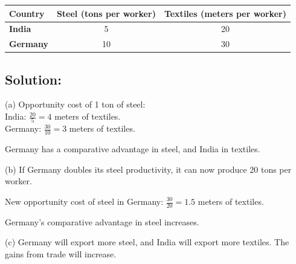 \documentclass{article}
\begin{document}
\begin{table}[h]
    \centering
    \begin{tabular}{lcc}
        \toprule
        Country & Steel (tons per worker) & Textiles (meters per worker) \\
        \midrule
        \textbf{India} & 5 & 20 \\
        \textbf{Germany} & 10 & 30 \\
        \bottomrule
    \end{tabular}
\end{table}

\subsection*{Solution:}
(a) Opportunity cost of 1 ton of steel:  \\
India: \( \frac{20}{5} = 4 \) meters of textiles.  \\
Germany: \( \frac{30}{10} = 3 \) meters of textiles.

Germany has a comparative advantage in steel, and India in textiles.

(b) If Germany doubles its steel productivity, it can now produce 20 tons per worker.

New opportunity cost of steel in Germany: \( \frac{30}{20} = 1.5 \) meters of textiles.

Germany's comparative advantage in steel increases.

(c) Germany will export more steel, and India will export more textiles. The gains from trade will increase.
\end{document}

